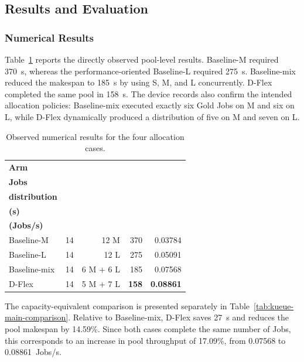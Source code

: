 \subsection{Results and Evaluation}
\label{subsec:kueue-results}

\subsubsection{Numerical Results}

Table~\ref{tab:kueue-all-arm-results} reports the directly observed pool-level results. Baseline-M required 370~s, whereas the performance-oriented Baseline-L required 275~s. Baseline-mix reduced the makespan to 185~s by using S, M, and L concurrently. D-Flex completed the same pool in 158~s. The device records also confirm the intended allocation policies: Baseline-mix executed exactly six Gold Jobs on M and six on L, while D-Flex dynamically produced a distribution of five on M and seven on L.

\begin{table}[htbp]
    \centering
    \small
    \caption{Observed numerical results for the four allocation cases.}
    \label{tab:kueue-all-arm-results}
    \begin{tabular}{lrrrr}
        \toprule
        \textbf{Arm} & \makecell{\textbf{Completed}\\\textbf{Jobs}} & \makecell{\textbf{Gold device}\\\textbf{distribution}} & \makecell{\textbf{Makespan}\\\textbf{(s)}} & \makecell{\textbf{Throughput}\\\textbf{(Jobs/s)}} \\
        \midrule
        Baseline-M & 14 & 12 M & 370 & 0.03784 \\
        Baseline-L & 14 & 12 L & 275 & 0.05091 \\
        Baseline-mix & 14 & 6 M + 6 L & 185 & 0.07568 \\
        D-Flex & 14 & 5 M + 7 L & \textbf{158} & \textbf{0.08861} \\
        \bottomrule
    \end{tabular}
\end{table}

The capacity-equivalent comparison is presented separately in Table~\ref{tab:kueue-main-comparison}. Relative to Baseline-mix, D-Flex saves 27~s and reduces the pool makespan by 14.59\%. Since both cases complete the same number of Jobs, this corresponds to an increase in pool throughput of 17.09\%, from 0.07568 to 0.08861~Jobs/s.

